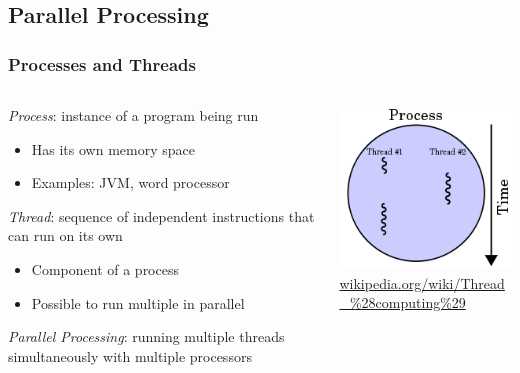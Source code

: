 \documentclass{beamer}
\newcommand{\linespace}{\vskip 0.25cm}
\begin{document}
\subsection[PP Basics]{Parallel Processing}

\begin{frame}

\frametitle{Processes and Threads}

\begin{columns}
\begin{column}{0.7\textwidth}

\emph{Process}: instance of a program being run
\begin{itemize}
\item Has its own memory space
\item Examples: JVM, word processor
\end{itemize}

\linespace
\linespace

\emph{Thread}: sequence of independent instructions that can run on its own
\begin{itemize}
\item Component of a process
\item Possible to run multiple in parallel
\end{itemize}

\linespace
\linespace

\emph{Parallel Processing}: running multiple threads simultaneously with multiple processors

\end{column}

\begin{column}{0.30\textwidth}

\begin{center}
\includegraphics[width=1.0\textwidth]{Illustrations/multithreading.png} \\
{\small \url{wikipedia.org/wiki/Thread_\%28computing\%29}}
\end{center}


\end{column}
\end{columns}
\end{frame}
\end{document}
